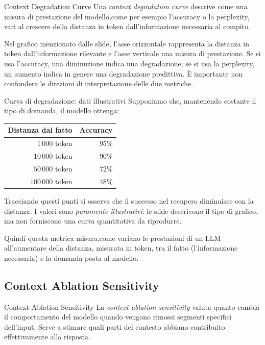 \begin{definition}{Context Degradation Curve}
Una \emph{context degradation curve} descrive come una misura di prestazione del modello,come per esempio l'accuracy o la perplexity, vari al crescere della distanza in token dall'informazione necessaria al compito.
\end{definition}

Nel grafico menzionato dalle slide, l'asse orizzontale rappresenta la distanza in token dall'informazione rilevante e l'asse verticale una misura di prestazione. Se si usa l'accuracy, una diminuzione indica una degradazione; se si usa la perplexity, un aumento indica in genere una degradazione predittiva. È importante non confondere le direzioni di interpretazione delle due metriche.

\begin{example}{Curva di degradazione: dati illustrativi}
Supponiamo che, mantenendo costante il tipo di domanda, il modello ottenga:
\begin{center}
\begin{tabular}{r|r}
\textbf{Distanza dal fatto} & \textbf{Accuracy} \\
\hline
$1\,000$ token & $95\%$ \\
$10\,000$ token & $90\%$ \\
$50\,000$ token & $72\%$ \\
$100\,000$ token & $48\%$
\end{tabular}
\end{center}
Tracciando questi punti si osserva che il successo nel recupero diminuisce con la distanza. I valori sono \emph{puramente illustrativi}: le slide descrivono il tipo di grafico, ma non forniscono una curva quantitativa da riprodurre.
\end{example}
Quindi questa metrica misura,come variano le prestazioni di un LLM all'aumentare della distanza, misurata in token, tra il fatto (l'informazione necessaria) e la domanda posta al modello.
\subsection{Context Ablation Sensitivity}

\begin{definition}{Context Ablation Sensitivity}
La \emph{context ablation sensitivity} valuta quanto cambia il comportamento del modello quando vengono rimossi segmenti specifici dell'input. Serve a stimare quali parti del contesto abbiano contribuito effettivamente alla risposta.
\end{definition}

